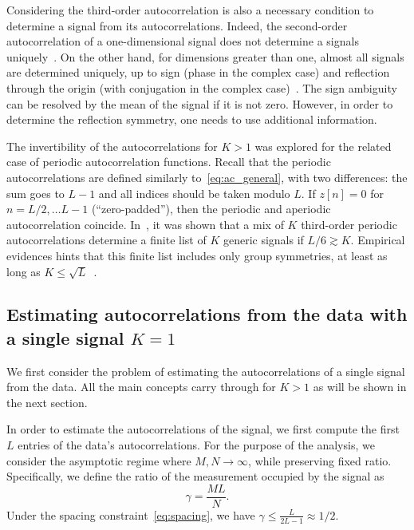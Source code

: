 \documentclass[english,11pt]{article}
\newcommand{\TODO}[1]{{\color{red}{[#1]}}}
\numberwithin{equation}{section}
\theoremstyle{plain}
\theoremstyle{definition}
\theoremstyle{remark}
\theoremstyle{plain}
\theoremstyle{remark}
\theoremstyle{plain}
\theoremstyle{plain}
\begin{document}
Considering the third-order autocorrelation is also a necessary condition to determine a signal from its autocorrelations. Indeed, the second-order autocorrelation of a one-dimensional signal does not determine a signals uniquely~\cite{beinert2015ambiguities,bendory2017fourier}. On the other hand, for dimensions greater than one, almost all signals are determined uniquely, up to sign (phase in the complex case) and reflection through the origin (with conjugation in the complex case)~\cite{hayes1982reconstruction,hayes1982reducible}. The sign ambiguity can be resolved by the mean of the signal if it is not zero. However,  in order to determine the reflection symmetry, one needs to use additional information.

\TODO{I would remove most if this paragraph; we can have a similar discussion but for our case (after having discussing which moments we keep); make the statement, and finish with a one-sentence reference to the MRA paper.}
The invertibility of the autocorrelations for $K>1$ was explored  for the related case of  periodic autocorrelation functions. Recall that the  periodic autocorrelations are defined similarly to~\eqref{eq:ac_general}, with two differences: the sum goes to $L-1$ and all indices should be taken modulo $L$.
If $z[n]=0$ for $n=L/2,\ldots L-1$ (``zero-padded''), then the periodic and aperiodic autocorrelation coincide.
In~\cite{bandeira2017estimation}, it was shown that a mix of $K$ third-order periodic autocorrelations determine  a finite list of $K$ generic signals if $L/6\gtrsim K$. Empirical evidences hints that this finite list includes only group symmetries, at least as long as $K\leq\sqrt{L}$~\cite{boumal2017heterogeneous}. 


\subsection{Estimating autocorrelations from the data with a single signal $K=1$} \label{sec:estimating_ac_k1}

We first consider the problem of estimating the autocorrelations of a single signal from the data. 
All the main concepts carry through for $K>1$ as will be shown in the next section.  

In order to estimate the autocorrelations of the signal, we first compute the first $L$ entries of the data's autocorrelations. 
For the purpose of the analysis, we consider  the asymptotic regime where $M,N\to\infty$, while preserving fixed ratio. 
Specifically, we define the ratio of the measurement occupied by  the signal as
\begin{equation}
\gamma = \frac{M L}{N}.
\end{equation}
Under the spacing constraint~\eqref{eq:spacing}, we have $\gamma\leq\frac{L}{2L-1}\approx 1/2$.
\end{document}
